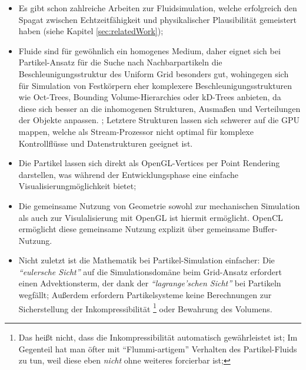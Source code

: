 	\begin{itemize}
 	\item Es gibt schon zahlreiche Arbeiten zur Fluidsimulation, welche erfolgreich den Spagat zwischen Echtzeitfähigkeit 
 	und physikalischer Plausibilität gemeistert haben (siehe Kapitel \ref{sec:relatedWork});
 	\item Fluide sind für gewöhnlich ein homogenes Medium, daher eignet sich bei Partikel-Ansatz für die Suche nach 
 	Nachbarpartikeln die \linebreak Beschleunigungsstruktur des Uniform Grid besonders gut, wohingegen sich für Simulation 
 	von Festkörpern eher komplexere Beschleunigungsstrukturen wie Oct-Trees, Bounding Volume-Hierarchies oder kD-Trees 
 	anbieten, da diese sich besser an die inhomogenen Strukturen, Ausmaßen und Verteilungen der Objekte anpassen.
 		; 	
 	Letztere Strukturen lassen sich schwerer auf die GPU mappen, welche als Stream-Prozessor nicht optimal für komplexe 
	Kontrollflüsse und Datenstrukturen geeignet ist.
	\item Die Partikel lassen sich direkt als OpenGL-Vertices per Point Rendering darstellen, was während der 
	Entwicklungsphase eine einfache Visualisierungmöglichkeit bietet;
	\item Die gemeinsame Nutzung von Geometrie sowohl zur mechanischen Simulation als auch zur Visulalisierung mit OpenGL
	ist hiermit ermöglicht. OpenCL ermöglicht diese gemeinsame Nutzung explizit über gemeinsame Buffer-Nutzung.
	\item Nicht zuletzt ist die Mathematik bei Partikel-Simulation einfacher: Die \emph{"`eulersche Sicht"'} auf die 
	Simulationsdomäne beim Grid-Ansatz erfordert einen Advektionsterm, der dank der \emph{"`lagrange'schen Sicht"'} bei
	Partikeln wegfällt; Außerdem erfordern Partikelsysteme keine Berechnungen zur Sicherstellung der
	Inkompressibilität
	\footnote{
		Das heißt nicht, dass die Inkompressibilität automatisch gewährleistet ist; Im Gegenteil 
		hat man öfter mit "`Flummi-artigem"' Verhalten des Partikel-Fluids zu tun, weil diese eben \emph{nicht} ohne 
		weiteres forcierbar ist;
	}  
	oder Bewahrung des Volumens.

	\end{itemize}


\clearpage
